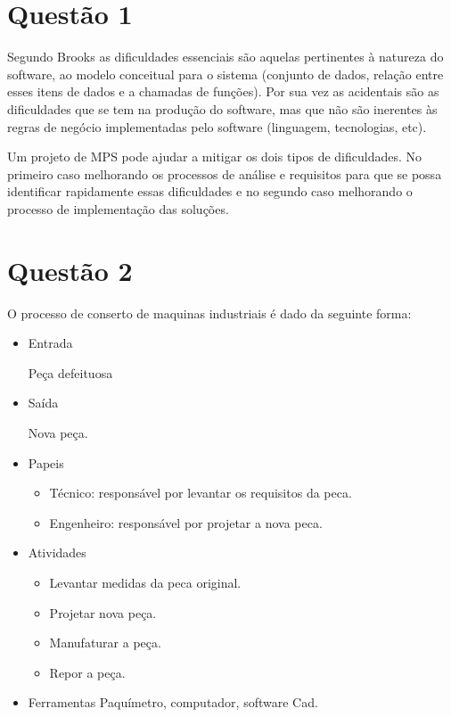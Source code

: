 \section{Questão 1} 

Segundo Brooks as dificuldades essenciais são aquelas pertinentes à natureza do software,
ao modelo conceitual para o sistema (conjunto de
dados, relação entre esses itens de dados e a
chamadas de funções). Por sua vez as acidentais são as dificuldades que se tem na produção
do software, mas que não são inerentes às regras de
negócio implementadas pelo software (linguagem,
tecnologias, etc).

Um projeto de MPS pode ajudar a mitigar os dois tipos de dificuldades. No primeiro caso melhorando os processos de análise e requisitos para que se possa
identificar rapidamente essas dificuldades e no segundo caso melhorando o processo de implementação das soluções.

\section{Questão 2}

O processo de conserto de maquinas industriais é dado da seguinte forma:
\begin{itemize}
    \item Entrada

        Peça defeituosa

    \item Saída

        Nova peça.

    \item Papeis
        \begin{itemize}
            \item Técnico: responsável por levantar os requisitos da peca.
            \item Engenheiro: responsável por projetar a nova peca.
        \end{itemize}
        
    \item Atividades
       \begin{itemize}
        \item Levantar medidas da peca original.
        \item Projetar nova peça.
        \item Manufaturar a peça.
        \item Repor a peça.
       \end{itemize} 
    \item Ferramentas
       Paquímetro, computador, software Cad.
    
\end{itemize}


